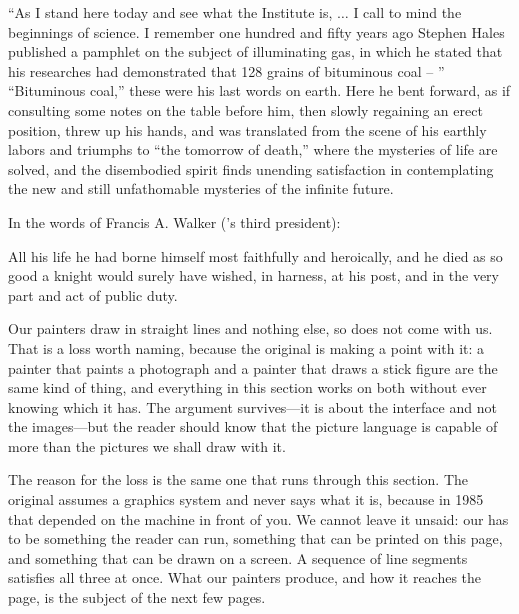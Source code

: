{\begin{quoteInFootnote}
``As I stand here today and see what the Institute is, \( \dots \) I call to
mind the beginnings of science. I remember one hundred and fifty years ago
Stephen Hales published a pamphlet on the subject of illuminating gas, in which
he stated that his researches had demonstrated that 128 grains of bituminous
coal -- '' ``Bituminous coal,'' these were his last words on earth. Here he
bent forward, as if consulting some notes on the table before him, then slowly
regaining an erect position, threw up his hands, and was translated from the
scene of his earthly labors and triumphs to ``the tomorrow of death,'' where
the mysteries of life are solved, and the disembodied spirit finds unending
satisfaction in contemplating the new and still unfathomable mysteries of the
infinite future.
\end{quoteInFootnote}

In the words of Francis A. Walker ('s third president):

\begin{quoteInFootnote}
All his life he had borne himself most faithfully and heroically, and he died
as so good a knight would surely have wished, in harness, at his post, and in
the very part and act of public duty.
\end{quoteInFootnote}
}
\begin{buildFromScarcity}
Our painters draw in straight lines and nothing else, so  does not
come with us.  That is a loss worth naming, because the original is making a
point with it: a painter that paints a photograph and a painter that draws a
stick figure are the same kind of thing, and everything in this section works
on both without ever knowing which it has.  The argument survives---it is about
the interface and not the images---but the reader should know that the picture
language is capable of more than the pictures we shall draw with it.

The reason for the loss is the same one that runs through this section.  The
original assumes a graphics system and never says what it is, because in 1985
that depended on the machine in front of you.  We cannot leave it unsaid: our
 has to be something the reader can run, something that can be
printed on this page, and something that can be drawn on a screen.  A sequence
of line segments satisfies all three at once.  What our painters produce, and
how it reaches the page, is the subject of the next few pages.
\end{buildFromScarcity}


